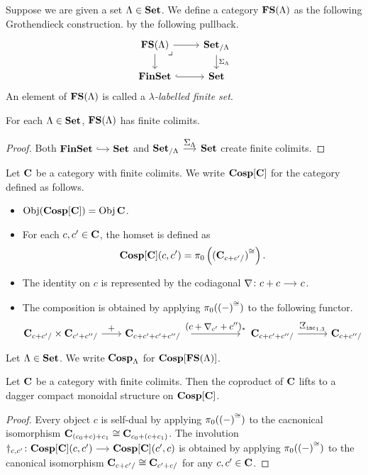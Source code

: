 \documentclass[a4paper,dvipsnames, 11pt]{amsart} %
\begin{document}
\begin{definition}
	Suppose we are given
	a set $\Lambda\in\mathbf{Set}$.
	We define a category
	$\operatorname{\mathbf{FS}}(\Lambda)$
	as the following Grothendieck construction.
	by the following pullback.
	\[
		\begin{tikzcd}[row sep=5mm]
			\FS(\Lambda)
			\ar[r]
			\ar[d]
			\pullback[rd]
				&
				\Set_{/\Lambda}
				\ar[d,"\Sigma_\Lambda"]
			\\
			\FinSet
			\ar[r,hook]
				&
				\Set
		\end{tikzcd}
	\]
	An element of $\operatorname{\mathbf{FS}}(\Lambda)$ is called a
	\emph{$\lambda$-labelled finite set}.
\end{definition}
\begin{proposition}
	For each $\Lambda\in\mathbf{Set}$,
	$\operatorname{\mathbf{FS}}(\Lambda)$ has finite colimits.
\end{proposition}
\begin{proof}
	Both $\FinSet\arr[hook]\Set$ and $\Set_{/\Lambda}\arr"\Sigma_\Lambda"\Set$ create finite colimits.
\end{proof}
\begin{definition}
	Let $\mathbf{C}$ be a category with finite colimits.
	We write $\Cosp[\one{C}]$ for the category defined as follows.
	\begin{itemize}
		\item %
			$\Obj(\Cosp[\one{C}])=\Obj{\one{C}}$.
		\item %
			For each $c,c'\in\mathbf{C}$,
			the homset is defined as
			\[
				\Cosp[\one{C}](c,c')=\pi_0\left(\core{(\one{C}_{c+c'/})}\right)
				\text{.}
			\]
		\item %
			The identity on $c$ is represented by the codiagonal $\Atled\colon c+c\arr c$.
		\item %
			The composition is obtained by applying $\pi_0({(-)}^{\cong})$ to the following functor.
			\[
				\one{C}_{c+c'/}
				\times
				\one{C}_{c'+c''/}
				\arr"+"[][2]
				\one{C}_{c+c'+c'+c''/}
				\arr"{(c+\Atled_{c'}+c'')_*}"[][5]
				\one{C}_{c+c'+c''/}
				\arr"{\arbSigma_{\inc_{1,3}}}"[][3]
				\one{C}_{c+c''/}
			\]
		\qedhere %
	\end{itemize}
\end{definition}
\begin{definition}
	Let $\Lambda\in\mathbf{Set}$.
	We write $\mathbf{Cosp}_\Lambda$ for $\Cosp[\FS(\Lambda)]$.
\end{definition}
\begin{proposition}
	Let $\mathbf{C}$ be a category with finite colimits.
	Then the coproduct of $\mathbf{C}$ lifts to a dagger compact monoidal structure on $\Cosp[\one{C}]$.
\end{proposition}
\begin{proof}
	Every object $c$ is self-dual by applying $\pi_0({(-)}^{\cong})$ to the cacnonical isomorphism
	$\mathbf{C}_{(c_0+c)+c_1}\cong\mathbf{C}_{c_0+(c+c_1)}$.
	The involution
	$\dagger_{c,c'}\colon\Cosp[\one{C}](c,c')\arr\Cosp[\one{C}](c',c)$
	is obtained by applying $\pi_0({(-)}^{\cong})$ to the canonical isomorphism
	$\mathbf{C}_{c+c'/}\cong\mathbf{C}_{c'+c/}$ for any $c,c'\in\mathbf{C}$.
\end{proof}
\begin{definition}
\end{definition}
\end{document}
